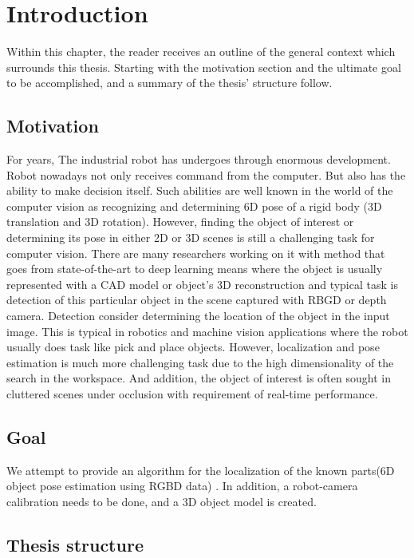 \chapter{Introduction}
\label{chap:intro}

Within this chapter, the reader receives an outline of the general context which surrounds this thesis. Starting with the motivation section and the ultimate goal to be accomplished, and a summary of the thesis' structure follow. 

\section{Motivation}


For years, The industrial robot has undergoes through enormous development. Robot nowadays not only receives command from the computer. But also has the ability to make decision itself. Such abilities are well known in the world of the computer vision as recognizing and determining 6D pose of a rigid body (3D translation and 3D rotation). However, finding the object of interest or determining its pose in either 2D or 3D scenes is still a challenging task for computer vision. There are many researchers working on it with method that goes from state-of-the-art to deep learning means where the object is usually represented with a CAD model or object's 3D reconstruction and typical task is detection of this particular object in the scene captured with RBGD or depth camera. Detection consider determining the location of the object in the input image. This is typical in robotics and machine vision applications where the robot usually does task like pick and place objects. However, localization and pose estimation is much more challenging task due to the high dimensionality of the search in the workspace. And addition, the object of interest is often sought in cluttered scenes under occlusion with requirement of real-time performance.

\section{Goal}


We attempt to provide an algorithm for the localization of the known parts(6D object pose estimation using RGBD data) \cite{intro2}. In addition, a robot-camera calibration needs to be done, and a 3D object model is created.

\section{Thesis structure}


